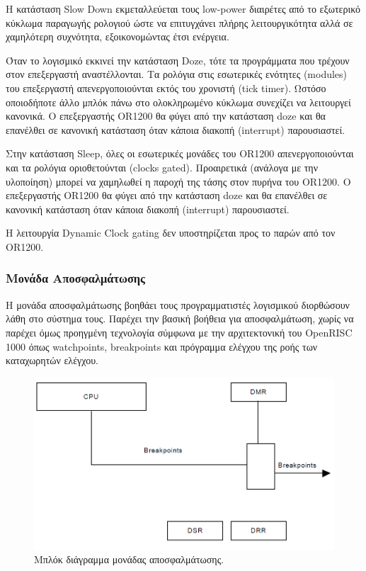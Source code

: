 \documentclass[a4paper,10pt]{article}
\numberwithin{figure}{section}
\numberwithin{table}{section}
\begin{document}
Η κατάσταση Slow Down εκμεταλλεύεται τους low-power διαιρέτες από το εξωτερικό κύκλωμα 
παραγωγής ρολογιού ώστε να επιτυγχάνει πλήρης λειτουργικότητα αλλά σε χαμηλότερη συχνότητα, εξοικονομώντας έτσι ενέργεια.
\newline

Όταν το λογισμικό εκκινεί την κατάσταση Doze, τότε τα προγράμματα που τρέχουν στον επεξεργαστή
αναστέλλονται. Τα ρολόγια στις εσωτερικές ενότητες (modules) του επεξεργαστή απενεργοποιούνται 
εκτός του χρονιστή (tick timer). Ωστόσο οποιοδήποτε άλλο μπλόκ πάνω στο ολοκληρωμένο κύκλωμα
συνεχίζει να λειτουργεί κανονικά. Ο επεξεργαστής OR1200 θα φύγει από την κατάσταση doze και 
θα επανέλθει σε κανονική κατάσταση όταν κάποια διακοπή (interrupt) παρουσιαστεί.
\newline

Στην κατάσταση Sleep, όλες οι εσωτερικές μονάδες του OR1200 απενεργοποιούνται και τα 
ρολόγια οριοθετούνται (clocks gated). Προαιρετικά (ανάλογα με την υλοποίηση) μπορεί να χαμηλωθεί 
η παροχή της τάσης στον πυρήνα του OR1200. Ο επεξεργαστής OR1200 θα φύγει από την κατάσταση doze και 
θα επανέλθει σε κανονική κατάσταση όταν κάποια διακοπή (interrupt) παρουσιαστεί.
\newline

Η λειτουργία Dynamic Clock gating δεν υποστηρίζεται προς το παρών από τον OR1200. 

\subsubsection{Μονάδα Αποσφαλμάτωσης}

Η μονάδα αποσφαλμάτωσης βοηθάει τους προγραμματιστές λογισμικού διορθώσουν λάθη στο σύστημα
τους. Παρέχει την βασική βοήθεια για αποσφαλμάτωση, χωρίς να παρέχει όμως προηγμένη τεχνολογία
σύμφωνα με την αρχιτεκτονική του OpenRISC 1000 όπως watchpoints, breakpoints και πρόγραμμα
ελέγχου της ροής των καταχωρητών ελέγχου.

\vspace{0.7cm}
\begin{figure}[h!]
 \centering
 \includegraphics[bb=0 0 869 498,scale=0.38]{./Images/debug_unit.png}
 \caption{Μπλόκ διάγραμμα μονάδας αποσφαλμάτωσης.}
\end{figure}
\vspace{0.7cm}
\end{document}
